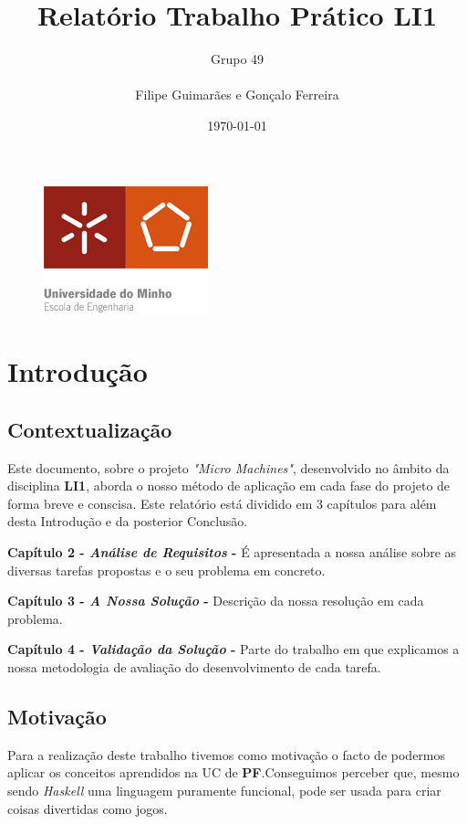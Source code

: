 \documentclass[a4paper]{report} %
\begin{document}
\title{ \textbf {Relatório Trabalho Prático LI1}}
\author{Grupo 49\\  
\\
Filipe Guimarães e Gonçalo Ferreira}
\date{\today}


\begin{figure}[b]
\centering %
\includegraphics[scale=0.7]{LOGO.PNG}    
\end{figure}

\maketitle

\tableofcontents %

\listoffigures


\chapter{Introdução}

  \section{Contextualização}
  
Este documento, sobre o projeto \emph{"Micro Machines"}, desenvolvido no âmbito da disciplina \textbf{LI1}, aborda o nosso método de aplicação em cada fase do projeto de forma breve e conscisa.
Este relatório está dividido em 3 capítulos para além desta Introdução e da posterior Conclusão.

\textbf{ Capítulo 2 - \emph{Análise de Requisitos} -} É apresentada a nossa análise sobre as diversas tarefas propostas e o seu problema em concreto.

\textbf{ Capítulo 3 - \emph{A Nossa Solução} -} Descrição da  nossa resolução em cada problema.

\textbf{ Capítulo 4 - \emph{Validação da Solução} -} Parte do trabalho em que explicamos a nossa metodologia de avaliação do desenvolvimento de cada tarefa.



  \section{Motivação}
Para a realização deste trabalho tivemos como motivação o facto de podermos aplicar os conceitos aprendidos na UC de \textbf{PF}.Conseguimos perceber que, mesmo sendo \emph{Haskell} uma linguagem puramente funcional, pode ser usada para criar coisas divertidas como jogos.
  
\end{document}
